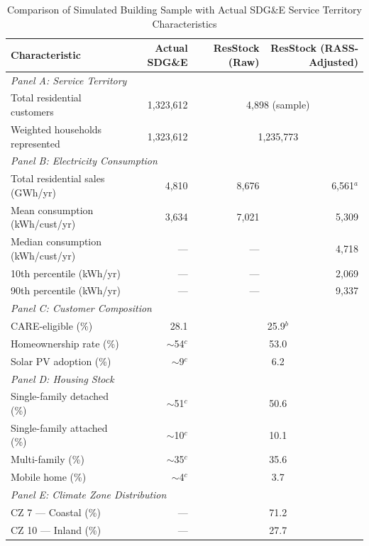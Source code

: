 \begin{table}[htbp]
\centering
\caption{Comparison of Simulated Building Sample with Actual SDG\&E Service Territory Characteristics}
\label{tab:sample_comparison}
\begin{tabular}{lrrr}
\toprule
\textbf{Characteristic} & \textbf{Actual SDG\&E} & \textbf{ResStock (Raw)} & \textbf{ResStock (RASS-Adjusted)} \\
\midrule
\multicolumn{4}{l}{\textit{Panel A: Service Territory}} \\
Total residential customers & 1,323,612 & \multicolumn{2}{c}{4,898 (sample)} \\
Weighted households represented & 1,323,612 & \multicolumn{2}{c}{1,235,773} \\
\midrule
\multicolumn{4}{l}{\textit{Panel B: Electricity Consumption}} \\
Total residential sales (GWh/yr) & 4,810 & 8,676 & 6,561$^a$ \\
Mean consumption (kWh/cust/yr) & 3,634 & 7,021 & 5,309 \\
Median consumption (kWh/cust/yr) & --- & --- & 4,718 \\
10th percentile (kWh/yr) & --- & --- & 2,069 \\
90th percentile (kWh/yr) & --- & --- & 9,337 \\
\midrule
\multicolumn{4}{l}{\textit{Panel C: Customer Composition}} \\
CARE-eligible (\%) & 28.1 & \multicolumn{2}{c}{25.9$^b$} \\
Homeownership rate (\%) & $\sim$54$^c$ & \multicolumn{2}{c}{53.0} \\
Solar PV adoption (\%) & $\sim$9$^c$ & \multicolumn{2}{c}{6.2} \\
\midrule
\multicolumn{4}{l}{\textit{Panel D: Housing Stock}} \\
Single-family detached (\%) & $\sim$51$^c$ & \multicolumn{2}{c}{50.6} \\
Single-family attached (\%) & $\sim$10$^c$ & \multicolumn{2}{c}{10.1} \\
Multi-family (\%) & $\sim$35$^c$ & \multicolumn{2}{c}{35.6} \\
Mobile home (\%) & $\sim$4$^c$ & \multicolumn{2}{c}{3.7} \\
\midrule
\multicolumn{4}{l}{\textit{Panel E: Climate Zone Distribution}} \\
CZ 7 --- Coastal (\%) & --- & \multicolumn{2}{c}{71.2} \\
CZ 10 --- Inland (\%) & --- & \multicolumn{2}{c}{27.7} \\

\end{tabular}
\end{table}
